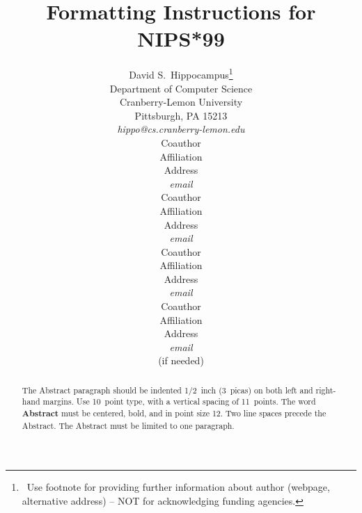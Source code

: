
\title{Formatting Instructions for NIPS*99}

\author{David S.~Hippocampus\thanks{ \ Use footnote for providing further 
information about author (webpage, alternative address) -- NOT for 
acknowledging funding agencies.} \\
Department of Computer Science\\ 
Cranberry-Lemon University\\
Pittsburgh, PA 15213 \\
{\it hippo@cs.cranberry-lemon.edu} \\
\And
Coauthor  \\
Affiliation          \\
Address \\             
{\it email} \\
\AND
Coauthor  \\
Affiliation          \\
Address \\             
{\it email} \\
\And
Coauthor  \\
Affiliation          \\
Address \\             
{\it email} \\
\And
Coauthor   \\
Affiliation \\         
Address    \\          
{\it email} \\
(if needed)\\
}


%




\maketitle



\begin{abstract}
The Abstract paragraph should be indented 1/2~inch (3~picas) on
both left and right-hand margins. Use 10~point type, with a
vertical spacing of 11~points. The word  {\bf Abstract} must be centered,
bold, and in point size 12. Two line spaces precede the Abstract.
The Abstract must be limited to one paragraph.
\end{abstract}

